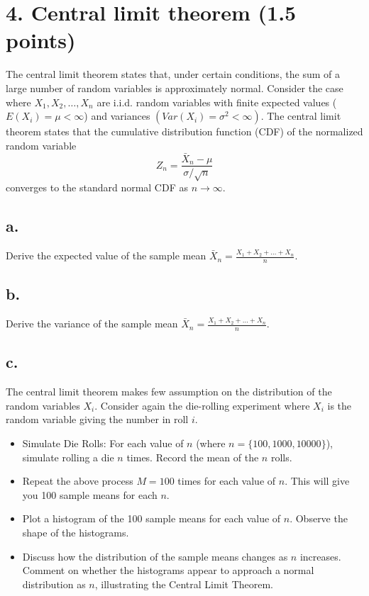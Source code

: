 \documentclass[
]{article}
\begin{document}
\section{4. Central limit theorem (1.5
points)}\label{central-limit-theorem-1.5-points}

The central limit theorem states that, under certain conditions, the sum
of a large number of random variables is approximately normal. Consider
the case where \(X_1, X_2,\ldots,X_n\) are i.i.d. random variables with
finite expected values (\(E(X_i)=\mu<\infty\)) and variances
\((Var(X_i)=\sigma^2<\infty)\). The central limit theorem states that
the cumulative distribution function (CDF) of the normalized random
variable \[
Z_n = \frac{\bar X_n - \mu}{\sigma/\sqrt{n}}
\] converges to the standard normal CDF as \(n\rightarrow\infty\).

\subsection{a.}\label{a.-3}

Derive the expected value of the sample mean
\(\bar X_n=\frac{X_1+X_2+\ldots+X_n}{n}\).

\subsection{b.}\label{b.-3}

Derive the variance of the sample mean
\(\bar X_n=\frac{X_1+X_2+\ldots+X_n}{n}\).

\subsection{c.}\label{c.-3}

The central limit theorem makes few assumption on the distribution of
the random variables \(X_i\). Consider again the die-rolling experiment
where \(X_i\) is the random variable giving the number in roll \(i\).

\begin{itemize}
\item
  Simulate Die Rolls: For each value of \(n\) (where
  \(n=\{100,1000,10000\}\)), simulate rolling a die \(n\) times. Record
  the mean of the \(n\) rolls.
\item
  Repeat the above process \(M=100\) times for each value of \(n\). This
  will give you 100 sample means for each \(n\).
\item
  Plot a histogram of the 100 sample means for each value of \(n\).
  Observe the shape of the histograms.
\item
  Discuss how the distribution of the sample means changes as \(n\)
  increases. Comment on whether the histograms appear to approach a
  normal distribution as \(n\), illustrating the Central Limit Theorem.
\end{itemize}
\end{document}
